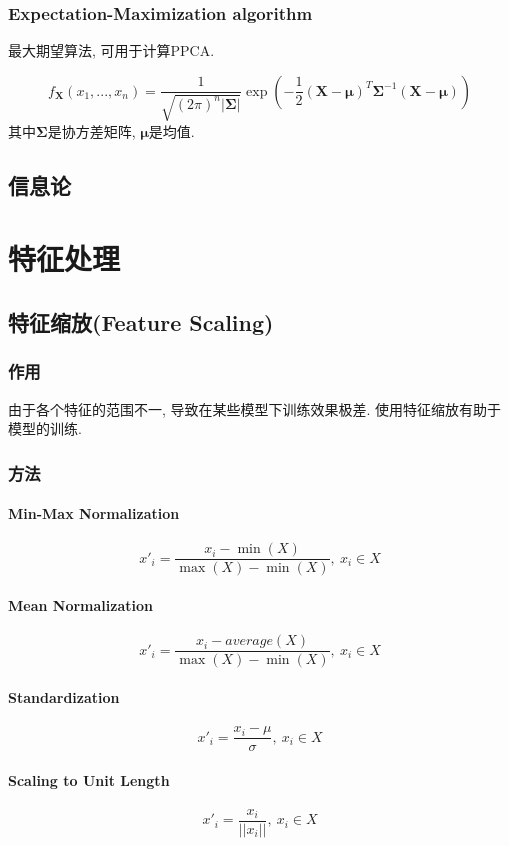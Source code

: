 \documentclass[oneside]{book}
\begin{document}
			\subsection{Expectation-Maximization algorithm}
				最大期望算法, 可用于计算PPCA.
				
				$$f_{\boldsymbol{X}}(x_{1}, ... , x_{n}) = \frac{1}{\sqrt{(2\pi)^{n}|\boldsymbol{\Sigma}|}}\exp{\left(-\frac{1}{2}(\boldsymbol{X}-\boldsymbol{\mu})^{T}\boldsymbol{\Sigma}^{-1}(\boldsymbol{X}-\boldsymbol{\mu})\right)}$$
				其中$\boldsymbol{\Sigma}$是协方差矩阵, $\boldsymbol{\mu}$是均值.
		
		\section{信息论}
	\setcounter{chapter}{0}
	\renewcommand{\thechapter}{\arabic{chapter}}
	\chapter{特征处理}
		\section{特征缩放(Feature Scaling)}
			\subsection{作用}
				由于各个特征的范围不一, 导致在某些模型下训练效果极差. 使用特征缩放有助于模型的训练.
			\subsection{方法}
				\subsubsection{Min-Max Normalization}
					$$x'_i = \frac{x_i - \min{(X)}}{\max{(X)} - \min{(X)}},~x_i\in X$$
				\subsubsection{Mean Normalization}
					$$x'_i = \frac{x_i - average(X)}{\max{(X)} - \min{(X)}},~x_i\in X$$
				\subsubsection{Standardization}
					$$x'_i = \frac{x_i - \mu}{\sigma},~x_{i}\in X$$
				\subsubsection{Scaling to Unit Length}
				 	$$x'_i = \frac{x_{i}}{||x_{i}||}, ~x_i \in X$$
\end{document}

